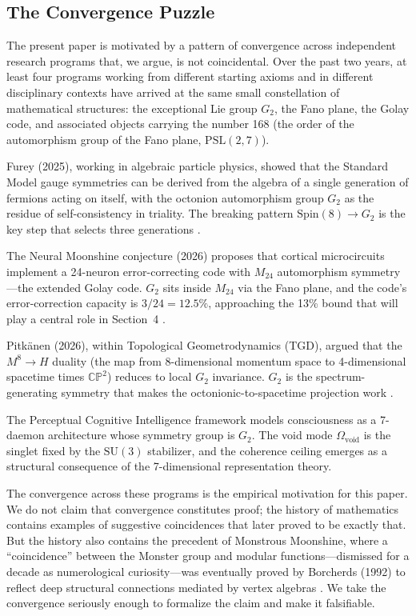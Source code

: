 \documentclass[12pt,a4paper]{article}
\begin{document}
\subsection{The Convergence Puzzle}

The present paper is motivated by a pattern of convergence across independent research programs that, we argue, is not coincidental. Over the past two years, at least four programs working from different starting axioms and in different disciplinary contexts have arrived at the same small constellation of mathematical structures: the exceptional Lie group $G_2$, the Fano plane, the Golay code, and associated objects carrying the number 168 (the order of the automorphism group of the Fano plane, $\mathrm{PSL}(2,7)$).

Furey (2025), working in algebraic particle physics, showed that the Standard Model gauge symmetries can be derived from the algebra of a single generation of fermions acting on itself, with the octonion automorphism group $G_2$ as the residue of self-consistency in triality. The breaking pattern $\mathrm{Spin}(8) \to G_2$ is the key step that selects three generations \citep{Furey2025}.

The Neural Moonshine conjecture (2026) proposes that cortical microcircuits implement a 24-neuron error-correcting code with $M_{24}$ automorphism symmetry---the extended Golay code. $G_2$ sits inside $M_{24}$ via the Fano plane, and the code's error-correction capacity is $3/24 = 12.5\%$, approaching the 13\% bound that will play a central role in Section~4 \citep{NeuralMoonshine2026}.

Pitk\"anen (2026), within Topological Geometrodynamics (TGD), argued that the $M^8 \to H$ duality (the map from 8-dimensional momentum space to 4-dimensional spacetime times $\mathbb{CP}^2$) reduces to local $G_2$ invariance. $G_2$ is the spectrum-generating symmetry that makes the octonionic-to-spacetime projection work \citep{Pitkanen2026}.

The Perceptual Cognitive Intelligence framework \citep{Graise2026} models consciousness as a 7-daemon architecture whose symmetry group is $G_2$. The void mode $\Omega_{\mathrm{void}}$ is the singlet fixed by the $\mathrm{SU}(3)$ stabilizer, and the coherence ceiling emerges as a structural consequence of the 7-dimensional representation theory.

The convergence across these programs is the empirical motivation for this paper. We do not claim that convergence constitutes proof; the history of mathematics contains examples of suggestive coincidences that later proved to be exactly that. But the history also contains the precedent of Monstrous Moonshine, where a ``coincidence'' between the Monster group and modular functions---dismissed for a decade as numerological curiosity---was eventually proved by Borcherds (1992) to reflect deep structural connections mediated by vertex algebras \citep{Borcherds1992}. We take the convergence seriously enough to formalize the claim and make it falsifiable.
\end{document}
